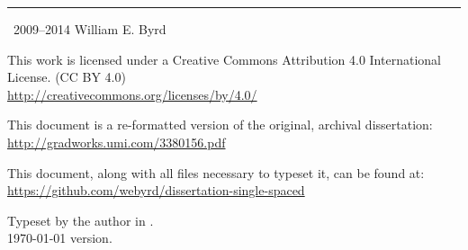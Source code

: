 \documentclass[onecolumn, 11pt, oneside, openright]{book}
\newcommand{\thesisauthor}[0]{William E. Byrd}
\newcommand{\thesisyear}[0]{2009}
\begin{document}
{
  \fontsize{12}{12}
  \mbox{}
  \vfill

  \hrule

\wspace

\noindent
\textcopyright~2009--2014 William E. Byrd

\wspace

\noindent
\huge
\ccLogo
\ccAttribution
\large

\wspace

\noindent
This work is licensed under a Creative Commons Attribution 4.0 International License.
(CC BY 4.0) \\
\url{http://creativecommons.org/licenses/by/4.0/}
  

\wspace

\noindent
This document is a re-formatted version of the original, archival dissertation: \\
\url{http://gradworks.umi.com/3380156.pdf}

\wspace

\noindent
This document, along with all files necessary to typeset it, can be found at: \\ \url{https://github.com/webyrd/dissertation-single-spaced}

\wspace

\noindent
Typeset by the author in \XeLaTeX. \\ \today\xspace version.


}






\end{document}
